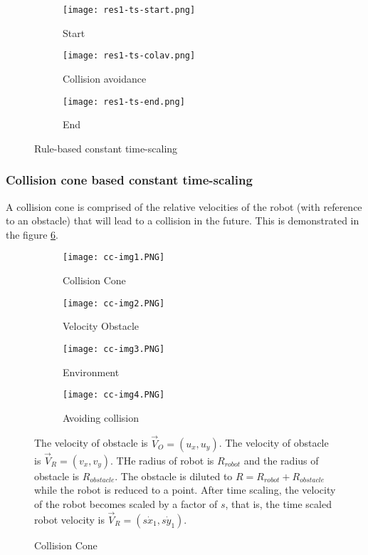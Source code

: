 \begin{figure}[ht]
    \centering
    \begin{subfigure}[b]{0.3\textwidth}
        \texttt{[image: res1-ts-start.png]}
        \caption{Start}
    \end{subfigure}
    \begin{subfigure}[b]{0.3\textwidth}
        \texttt{[image: res1-ts-colav.png]}
        \caption{Collision avoidance}
    \end{subfigure}
    \begin{subfigure}[b]{0.3\textwidth}
        \texttt{[image: res1-ts-end.png]}
        \caption{End}
    \end{subfigure}
    \caption{Rule-based constant time-scaling}
    \label{fig:rb-cts-exp1}
\end{figure}

\subsubsection{Collision cone based constant time-scaling}

A collision cone is comprised of the relative velocities of the robot (with reference to an obstacle) that will lead to a collision in the future. This is demonstrated in the figure \ref{fig:cc-cts-imgs}.

\begin{figure}[ht]
    \begin{subfigure}[b]{0.24\textwidth}
        \texttt{[image: cc-img1.PNG]}
        \caption{Collision Cone}
        \label{fig:sfig-cc-cts}
    \end{subfigure}
    \begin{subfigure}[b]{0.24\textwidth}
        \texttt{[image: cc-img2.PNG]}
        \caption{Velocity Obstacle}
        \label{fig:sfig-vo-cts}
    \end{subfigure}
    \begin{subfigure}[b]{0.24\textwidth}
        \texttt{[image: cc-img3.PNG]}
        \caption{Environment}
        \label{fig:sfig-env-cts}
    \end{subfigure}
    \begin{subfigure}[b]{0.24\textwidth}
        \texttt{[image: cc-img4.PNG]}
        \caption{Avoiding collision}
        \label{fig:sfig-ac-cts}
    \end{subfigure}
    \caption{Collision Cone}
    \label{fig:cc-cts-imgs}
    \small
        The velocity of obstacle is $\overrightarrow{V}_{O} = (u_x, u_y)$. The velocity of obstacle is $\overrightarrow{V}_{R} = (v_x, v_y)$. THe radius of robot is $R_{robot}$ and the radius of obstacle is $R_{obstacle}$. The obstacle is diluted to $R = R_{robot} + R_{obstacle}$ while the robot is reduced to a point.
        After time scaling, the velocity of the robot becomes scaled by a factor of $s$, that is, the time scaled robot velocity is $\vec{V}_{R} = (s\dot{x}_1, s\dot{y}_1)$.
\end{figure}

